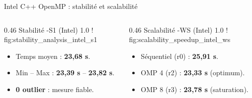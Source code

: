 \begin{frame}{Intel C++ OpenMP : stabilité et scalabilité}
    \begin{columns}[T,onlytextwidth]
        \begin{column}{0.46\textwidth}
                       {Stabilité -S1 (Intel)}
                       {1.0\linewidth}
                       {!}   
                       {fig:stability_analysis_intel_s1}
            
            \vspace{-0.2cm}
            \begin{itemize}\setlength{\itemsep}{2pt}
                \fontsize{7}{8}\selectfont
                \item Temps moyen : \textbf{23,68 s}.
                \item Min -- Max : \textbf{23,39 s} -- \textbf{23,82 s}.
                \item \textbf{0 outlier} : mesure fiable.
            \end{itemize}
        \end{column}

        \hfill 

        \begin{column}{0.46\textwidth}
                       {Scalabilité -WS (Intel)}
                       {1.0\linewidth} 
                       {!}           
                       {fig:scalability_speedup_intel_ws}
            
            \vspace{-0.2cm}
            \begin{itemize}\setlength{\itemsep}{2pt}
                \fontsize{7}{8}\selectfont
                \item Séquentiel (r0) : \textbf{25,91 s}.
                \item OMP 4 (r2) : \textbf{23,33 s} (optimum).
                \item OMP 8 (r3) : \textbf{23,78 s} (saturation).
            \end{itemize}
        \end{column}
    \end{columns}
\end{frame}

